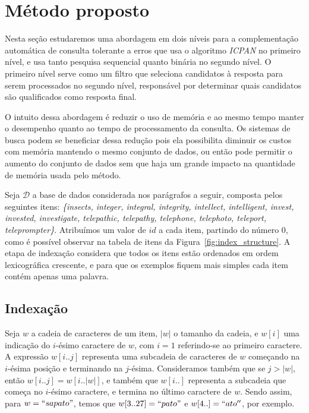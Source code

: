 \chapter{Método proposto} 
\label{sec:metodo}

Nesta seção estudaremos uma abordagem em dois níveis para a complementação automática de consulta tolerante a erros que usa o algoritmo \textit{ICPAN} no primeiro nível, e usa tanto pesquisa sequencial quanto binária no segundo nível. O primeiro nível serve como um filtro que seleciona candidatos à resposta para serem processados no segundo nível, responsável por determinar quais candidatos são qualificados como resposta final.

O intuito dessa abordagem é reduzir o uso de memória e ao mesmo tempo manter o desempenho quanto ao tempo de processamento da consulta. Os sistemas de busca podem se beneficiar dessa redução pois ela possibilita diminuir os custos com memória mantendo o mesmo conjunto de dados, ou então pode permitir o aumento do conjunto de dados sem que haja um grande impacto na quantidade de memória usada pelo método.

Seja $\mathcal{D}$ a base de dados considerada nos parágrafos a seguir, composta pelos seguintes itens: \textit{\{insects, integer, integral, integrity, intellect, intelligent, invest, invested, investigate, telepathic, telepathy, telephone, telephoto, teleport, teleprompter\}}. Atribuímos um valor de $id$ a cada item, partindo do número $0$, como é possível observar na tabela de itens da Figura~\ref{fig:index_structure}. A etapa de indexação considera que todos os itens estão ordenados em ordem lexicográfica crescente, e para que os exemplos fiquem mais simples cada item contém apenas uma palavra.
 
\section{Indexação} 
\label{sec:indexing}
Seja $w$ a cadeia de caracteres de um item, $|w|$ o tamanho da cadeia, e $w[i]$ uma indicação do $i$-ésimo caractere de $w$, com $i=1$ referindo-se ao primeiro caractere. A expressão $w[i..j]$ representa uma subcadeia de caracteres de $w$ começando na $i$-ésima posição e terminando na $j$-ésima. Consideramos também que se $j > |w|$, então $w[i..j] = w[i..|w|]$, e também que $w[i..]$ representa a subcadeia que começa no $i$-ésimo caractere, e termina no último caractere de $w$. Sendo assim, para $w = ``sapato"$, temos que $w[3..27] =  ``pato"$ e $w[4..] = ``ato''$, por exemplo.  


